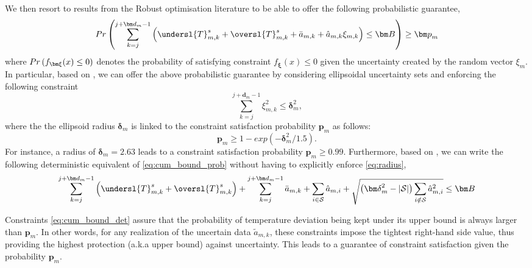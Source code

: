 We then resort to results from the Robust optimisation literature \citep{Elgh97,BenT98,BenT99,babonneau2009robust,hijazi2013robust} to be able to offer the following probabilistic guarantee,
\begin{equation}
\sc{Pr}\left(\sum\limits_{k=j}^{j+{\bm d}_m -1}\left(\undersl{T}^{s}_{m,k} + \oversl{T}^{s}_{m,k}  + \bar{a}_{m,k} + \hat{a}_{m,k} \xi_{m,k} \right)  \leq {\bm B} \right) \ge {\bm p}_m \label{eq:cum_bound_prob}
\end{equation}
where $\sc{Pr}\left(f_{\bm \xi}(x) \le 0\right)$ denotes the probability of satisfying constraint $f_{\bm \xi}(x) \le 0$ given the uncertainty created by the random vector $\xi_m$. In particular, based on \cite[Theorem 3.]{babonneau2009robust}, we can offer the above probabilistic guarantee by considering ellipsoidal uncertainty sets and enforcing the following constraint
 \begin{equation}\label{eq:radius}
 \sum\limits_{k=j}^{j+{\bm d}_m -1} {\xi}_{m,k}^2 \le \bm{\delta}_m^2,
 \end{equation}
where the the ellipsoid radius $\bm{\delta}_m$ is linked to the constraint satisfaction probability ${\bm p}_m$ as follows:
\begin{equation}
\label{eq:pm_delta_link}
\bm{p}_m \ge 1 - exp(-\bm{\delta}_m^2/1.5).
\end{equation}
For instance, a radius of $\bm{\delta}_m = 2.63$  leads to a constraint satisfaction probability $\bm{p}_m \ge 0.99$. 
Furthermore, based on \cite[Corollary 1.]{hijazi2013robust}, we can write the following deterministic equivalent of \eqref{eq:cum_bound_prob} without having to explicitly enforce \eqref{eq:radius},
\begin{equation}
\sum\limits_{k=j}^{j+{\bm d}_m -1}\left(\undersl{T}^{s}_{m,k}   +  \oversl{T}^{s}_{m,k} \right) + \sum\limits_{k=j}^{j+{\bm d}_m -1} \bar{a}_{m,k}  + \sum\limits_{i \in \mathcal{S}} \hat{a}_{m,i} + \sqrt{\left({\bm \delta}_m^2 - |\mathcal{S}|\right) \sum\limits_{i \notin \mathcal{S}} \hat{a}^2_{m,i}  } \leq {\bm B}
\label{eq:cum_bound_det}
\end{equation}

Constraints \eqref{eq:cum_bound_det} assure that the probability of temperature deviation being kept under its upper bound is always larger than ${\bm p}_m$. In other words, for any realization of the uncertain data $\tilde{a}_{m,k}$, these constraints impose the tightest right-hand side value, thus providing the highest protection (a.k.a upper bound) against uncertainty. This leads to a guarantee of constraint satisfaction given the probability ${\bm p}_m$. 

